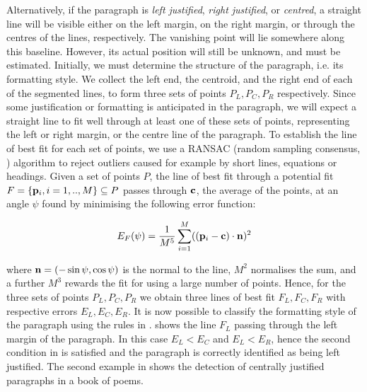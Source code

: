 Alternatively, if the paragraph is {\em left justified}, {\em right justified},
or {\em centred}, a straight line will be visible either on the left margin, on
the right margin, or through the centres of the lines, respectively.  The
vanishing point will lie somewhere along this baseline.  However, its actual
position will still be unknown, and must be estimated.  Initially, we must
determine the structure of the paragraph, i.e. its formatting style. We collect
the left end, the centroid, and the right end of each of the segmented lines, to
form three sets of points $P_L,P_C,P_R$ respectively.  Since some justification
or formatting is anticipated in the paragraph, we will expect a straight line to
fit well through at least one of these sets of points, representing the left or
right margin, or the centre line of the paragraph.  To establish the line of
best fit for each set of points, we use a RANSAC (random sampling consensus,
\cite{bolles81ransac-based}) algorithm to reject outliers caused for example by
short lines, equations or headings.  Given a set of points $P$, the line of best
fit through a potential fit $F=\{{ \bf p }_i, i=1,..,M\}\subseteq P$ passes
through ${ \bf c }$, the average of the points, at an angle $\psi$ found by
minimising the following error function:

\begin{equation}
E_F(\psi) = \frac{1}{M^5} \sum_{i=1}^{M} ( ({ \bf p }_i-{ \bf c }) \cdot { \bf n })^2
\label{ransacerroreqn}
\end{equation}

{\parindent 0mm
where ${ \bf n }=(-\sin \psi,\cos \psi)$ is the normal to the line, $M^{2}$
normalises the sum, and a further $M^{3}$ rewards the fit for using a large
number of points. Hence, for the three sets of points $P_L,P_C,P_R$ we obtain
three lines of best fit $F_L,F_C,F_R$ with respective errors
$E_L,E_C,E_R$.  It is now possible to classify the formatting style of the
paragraph using the rules in .
 shows the line $F_L$ passing through the left margin of
the paragraph.  In this case $E_L<E_C$ and $E_L<E_R$, hence the second
condition in  is satisfied and the paragraph is
correctly identified as being left justified. The second example in 
 shows the detection of centrally justified paragraphs
in a book of poems.
}

